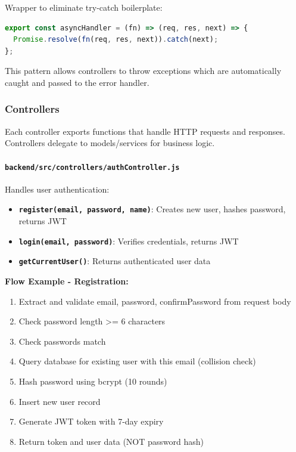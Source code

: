 \documentclass[12pt,a4paper,oneside]{article}
\newcommand{\fileref}[1]{\texttt{#1}}
\newcommand{\funcname}[1]{\texttt{\textbf{#1}}}
\begin{document}
Wrapper to eliminate try-catch boilerplate:

\begin{lstlisting}[language=JavaScript]
export const asyncHandler = (fn) => (req, res, next) => {
  Promise.resolve(fn(req, res, next)).catch(next);
};
\end{lstlisting}

This pattern allows controllers to throw exceptions which are automatically caught and passed to the error handler.

\subsubsection{Controllers}

Each controller exports functions that handle HTTP requests and responses. Controllers delegate to models/services for business logic.

\paragraph{\fileref{backend/src/controllers/authController.js}}

Handles user authentication:

\begin{itemize}
    \item \funcname{register(email, password, name)}: Creates new user, hashes password, returns JWT
    \item \funcname{login(email, password)}: Verifies credentials, returns JWT
    \item \funcname{getCurrentUser()}: Returns authenticated user data
\end{itemize}

\textbf{Flow Example - Registration:}

\begin{enumerate}
    \item Extract and validate email, password, confirmPassword from request body
    \item Check password length >= 6 characters
    \item Check passwords match
    \item Query database for existing user with this email (collision check)
    \item Hash password using bcrypt (10 rounds)
    \item Insert new user record
    \item Generate JWT token with 7-day expiry
    \item Return token and user data (NOT password hash)
\end{enumerate}
\end{document}
